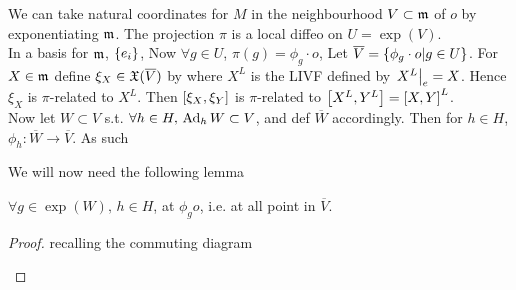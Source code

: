 \documentclass{article}
\begin{document}
We can take natural coordinates for $M$ in the neighbourhood $V\subset \mf{m}$ of $o$ by exponentiating $\mf{m}$. The projection $\pi$ is a local diffeo on $U = \exp(V)$. \\
In a basis for $\mf{m}$, $\pbrace{e_i}$,  
Now $\forall g \in U$, $\pi(g) = \phi_g \cdot o $, Let $\overline{V} = \pbrace{\phi_g \cdot o | g \in U}$. For $X \in \mf{m}$ define $\xi_X \in \mf{X}(\overline{V})$ by 
where $X^L$ is the LIVF defined by $\ev{X^L}{e} = X$. Hence $\xi_X$ is $\pi$-related to $X^L$. Then $\comm[\xi_X]{\xi_Y}$ is $\pi$-related to $\comm[X^L]{Y^L} = \comm[X]{Y}^L$. \\  
Now let $W\subset V$ s.t. $\forall h \in H , \, \Ad_hW \subset V$, and def $\overline{W}$ accordingly. Then for $h\in H$, $\phi_h : \overline{W} \to \overline{V}$. As such 

We will now need the following lemma 

\begin{lemma}
	$\forall g \in \exp(W), \, h \in H$, 
	at $\phi_g o $, i.e. at all point in $\overline{V}$. 
\end{lemma}
\begin{proof}
	recalling the commuting diagram 
	\begin{center}
	\end{center}
\end{proof}
\end{document}

